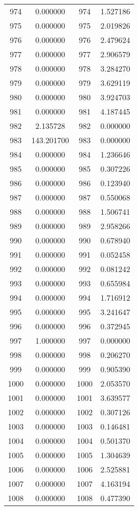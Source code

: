 \documentclass[12pt]{article}
\begin{document}
\begin{longtable}{@{}cccc@{}}
974 & 0.000000 & 974 & 1.527186 \\
975 & 0.000000 & 975 & 2.019826 \\
976 & 0.000000 & 976 & 2.479624 \\
977 & 0.000000 & 977 & 2.906579 \\
978 & 0.000000 & 978 & 3.284270 \\
979 & 0.000000 & 979 & 3.629119 \\
980 & 0.000000 & 980 & 3.924703 \\
981 & 0.000000 & 981 & 4.187445 \\
982 & 2.135728 & 982 & 0.000000 \\
983 & 143.201700 & 983 & 0.000000 \\
984 & 0.000000 & 984 & 1.236646 \\
985 & 0.000000 & 985 & 0.307226 \\
986 & 0.000000 & 986 & 0.123940 \\
987 & 0.000000 & 987 & 0.550068 \\
988 & 0.000000 & 988 & 1.506741 \\
989 & 0.000000 & 989 & 2.958266 \\
990 & 0.000000 & 990 & 0.678940 \\
991 & 0.000000 & 991 & 0.052458 \\
992 & 0.000000 & 992 & 0.081242 \\
993 & 0.000000 & 993 & 0.655984 \\
994 & 0.000000 & 994 & 1.716912 \\
995 & 0.000000 & 995 & 3.241647 \\
996 & 0.000000 & 996 & 0.372945 \\
997 & 1.000000 & 997 & 0.000000 \\
998 & 0.000000 & 998 & 0.206270 \\
999 & 0.000000 & 999 & 0.905390 \\
1000 & 0.000000 & 1000 & 2.053570 \\
1001 & 0.000000 & 1001 & 3.639577 \\
1002 & 0.000000 & 1002 & 0.307126 \\
1003 & 0.000000 & 1003 & 0.146481 \\
1004 & 0.000000 & 1004 & 0.501370 \\
1005 & 0.000000 & 1005 & 1.304639 \\
1006 & 0.000000 & 1006 & 2.525881 \\
1007 & 0.000000 & 1007 & 4.163194 \\
1008 & 0.000000 & 1008 & 0.477390 \\

\end{longtable}
\end{document}
